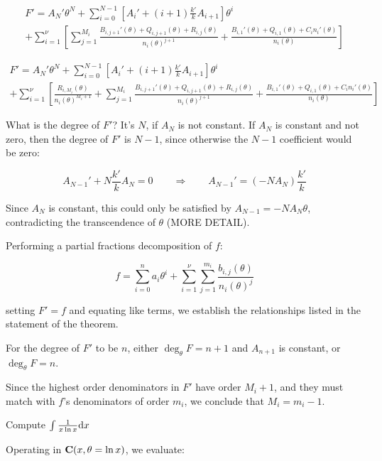 \begin{multline*}
F' = A_N' \theta^N + \sum_{i=0}^{N-1} \left[ A_i' + (i+1) \frac{k'}{k} A_{i+1} \right] \theta^{i} \\
+ \sum_{i=1}^\nu \left[ \sum_{j=1}^{M_i} \frac{B_{i,j+1}'(\theta) + Q_{i,j+1}(\theta) + R_{i,j}(\theta)}{n_i(\theta)^{j+1}}
  + \frac{B_{i,1}'(\theta) + Q_{i,1}(\theta) + C_i n_i'(\theta)}{n_i(\theta)} \right]
\end{multline*}

\begin{multline*}
F' = A_N' \theta^N + \sum_{i=0}^{N-1} \left[ A_i' + (i+1) \frac{k'}{k} A_{i+1} \right] \theta^{i} \\
+ \sum_{i=1}^\nu \left[ \frac{R_{i,M_i}(\theta)}{n_i(\theta)^{M_i+1}}
+ \sum_{j=1}^{M_i} \frac{B_{i,j+1}'(\theta) + Q_{i,j+1}(\theta) + R_{i,j}(\theta)}{n_i(\theta)^{j+1}}
  + \frac{B_{i,1}'(\theta) + Q_{i,1}(\theta) + C_i n_i'(\theta)}{n_i(\theta)} \right]
\end{multline*}

What is the degree of $F'$?  It's $N$, if $A_N$ is not constant.  If $A_N$ is constant and not zero, then
the degree of $F'$ is $N-1$, since otherwise the $N-1$ coefficient would be zero:

$$A_{N-1}' + N \frac{k'}{k} A_N = 0  \qquad\Longrightarrow\qquad A_{N-1}' = (- N A_N ) \frac{k'}{k}$$

Since $A_N$ is constant, this could only be satisfied by $A_{N-1} = - N A_N \theta$,
contradicting the transcendence of $\theta$ (MORE DETAIL).

Performing a partial fractions decomposition of $f$:

$$f = \sum_{i=0}^n a_i \theta^i
+ \sum_{i=1}^\nu \sum_{j=1}^{m_i} \frac{b_{i,j}(\theta)}{n_i(\theta)^j}$$

setting $F' = f$ and equating like terms, we establish the
relationships listed in the statement of the theorem.

For the degree of $F'$ to be $n$, either $\deg_\theta F = n+1$ and $A_{n+1}$ is
constant, or $\deg_\theta F = n$.

Since the highest order denominators in $F'$ have order $M_i + 1$, and
they must match with $f$'s denominators of order $m_i$, we conclude
that $M_i = m_i - 1$.

\endtheorem

\vfill\eject

\example Compute $\int {1\over{x \ln x}} {\rm d}x$

Operating in ${\bf C}(x, \theta = \ln x)$, we evaluate:

